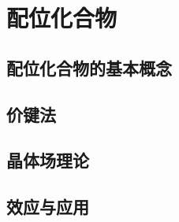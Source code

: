 \section{配位化合物}
\subsection{配位化合物的基本概念}
\subsection{价键法}
\subsection{晶体场理论}
\subsection{效应与应用}

\newpage
